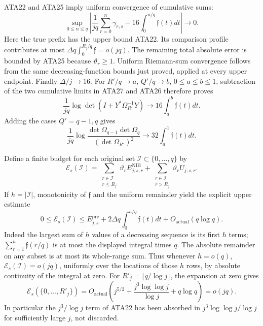 ATA22 and ATA25 imply uniform convergence of cumulative sums:
\[
 \sup_{0\le n\le q}
 \left|\frac1{jq}\sum_{r=0}^n\gamma_{r,s}
             -16\int_0^{n/q}\mathfrak f(t)dt\right|\longrightarrow0.
                                                               \tag{ATA27}
\]
Here the true prefix has the upper bound ATA22.  Its comparison
profile contributes at most
$\Delta q\int_0^{R_j/q}\mathfrak f=o(jq)$.
The remaining total absolute error is bounded by ATA25 because
$\vartheta_r\ge1$.  Uniform Riemann-sum convergence follows from
the same decreasing-function bounds just proved, applied at every
upper endpoint.  Finally $\Delta/j\to16$.
For $R'/q\to a$, $Q'/q\to b$, $0\le a\le b\le1$, subtraction
of the two cumulative limits in ATA27 and ATA26 therefore proves
\[
 \frac{1}{jq}\log\det(I+Y^*\Omega_{R'}^{-1}Y)
                   \longrightarrow16\int_a^b\mathfrak f(t)dt.
                                                               \tag{ATA28}
\]
Adding the cases $Q'=q-1,q$ gives
\[
 \frac1{jq}\log\frac{\det\Omega_{q-1}\det\Omega_q}
                       {(\det\Omega_{R'})^2}
                   \longrightarrow32\int_a^1\mathfrak f(t)dt.
                                                               \tag{ATA29}
\]

Define a finite budget for each original set
$\mathscr I\subset\{0,\ldots,q\}$ by
\[
 \mathcal E_s(\mathscr I)
 =\sum_{\substack{r\in\mathscr I\\r\le R_j}}
       \vartheta_rE^{\mathrm{NIB}}_{j,s,r}
  +\sum_{\substack{r\in\mathscr I\\r>R_j}}
       \vartheta_rU_{j,s,r}.                            \tag{ATA30}
\]
If $h=|\mathscr I|$, monotonicity of $\mathfrak f$ and the uniform
remainder yield the explicit upper estimate
\[
 0\le\mathcal E_s(\mathscr I)
 \le E^{\mathrm{pre}}_{j,s}
   +2\Delta q\int_0^{h/q}\mathfrak f(t)dt
   +O_{\mathrm{actual}}(q\log q).                      \tag{ATA31}
\]
Indeed the largest sum of $h$ values of a decreasing sequence is its
first $h$ terms; $\sum_{r=1}^h\mathfrak f(r/q)$ is at most the
displayed integral times $q$.  The absolute remainder on any subset
is at most its whole-range sum.  Thus whenever $h=o(q)$,
$\mathcal E_s(\mathscr I)=o(jq)$, uniformly over the locations of
those $h$ rows, by absolute continuity of the integral at zero.
For $R'_j=\lfloor q/\log j\rfloor$, the expansion at zero gives
\[
 \mathcal E_s(\{0,\ldots,R'_j\})
 =O_{\mathrm{actual}}\left(j^{5/2}
          +\frac{j^3\log\log j}{\log j}+q\log q\right)=o(jq).
                                                               \tag{ATA32}
\]
In particular the $j^3/\log j$ term of ATA22 has been absorbed in
$j^3\log\log j/\log j$ for sufficiently large $j$, not discarded.

